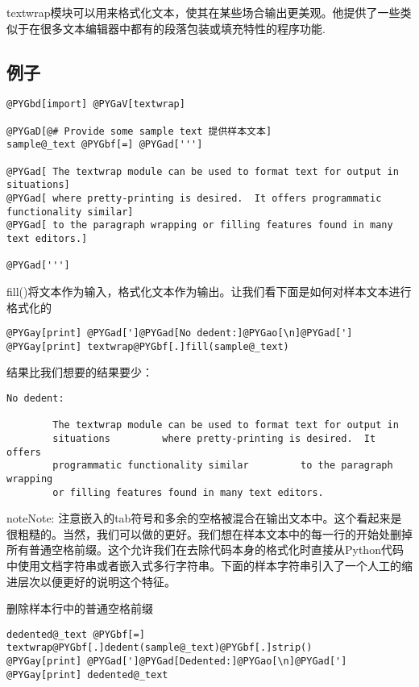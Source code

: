 \documentclass[letterpaper,10pt,english]{manual}
\begin{document}
textwrap模块可以用来格式化文本，使其在某些场合输出更美观。他提供了一些类似于在很多文本编辑器中都有的段落包装或填充特性的程序功能.


\subsection{例子}

\begin{Verbatim}[commandchars=@\[\]]
@PYGbd[import] @PYGaV[textwrap]

@PYGaD[@# Provide some sample text 提供样本文本]
sample@_text @PYGbf[=] @PYGad[''']

@PYGad[ The textwrap module can be used to format text for output in situations]
@PYGad[ where pretty-printing is desired.  It offers programmatic functionality similar]
@PYGad[ to the paragraph wrapping or filling features found in many text editors.]

@PYGad[''']
\end{Verbatim}

fill()将文本作为输入，格式化文本作为输出。让我们看下面是如何对样本文本进行格式化的

\begin{Verbatim}[commandchars=@\[\]]
@PYGay[print] @PYGad[']@PYGad[No dedent:]@PYGao[\n]@PYGad[']
@PYGay[print] textwrap@PYGbf[.]fill(sample@_text)
\end{Verbatim}

结果比我们想要的结果要少：

\begin{Verbatim}[commandchars=@\[\]]
No dedent:

        The textwrap module can be used to format text for output in
        situations         where pretty-printing is desired.  It offers
        programmatic functionality similar         to the paragraph wrapping
        or filling features found in many text editors.
\end{Verbatim}

\begin{notice}{note}{Note:}
注意嵌入的tab符号和多余的空格被混合在输出文本中。这个看起来是很粗糙的。当然，我们可以做的更好。我们想在样本文本中的每一行的开始处删掉所有普通空格前缀。这个允许我们在去除代码本身的格式化时直接从Python代码中使用文档字符串或者嵌入式多行字符串。下面的样本字符串引入了一个人工的缩进层次以便更好的说明这个特征。
\end{notice}

删除样本行中的普通空格前缀

\begin{Verbatim}[commandchars=@\[\]]
dedented@_text @PYGbf[=] textwrap@PYGbf[.]dedent(sample@_text)@PYGbf[.]strip()
@PYGay[print] @PYGad[']@PYGad[Dedented:]@PYGao[\n]@PYGad[']
@PYGay[print] dedented@_text
\end{Verbatim}
\end{document}
